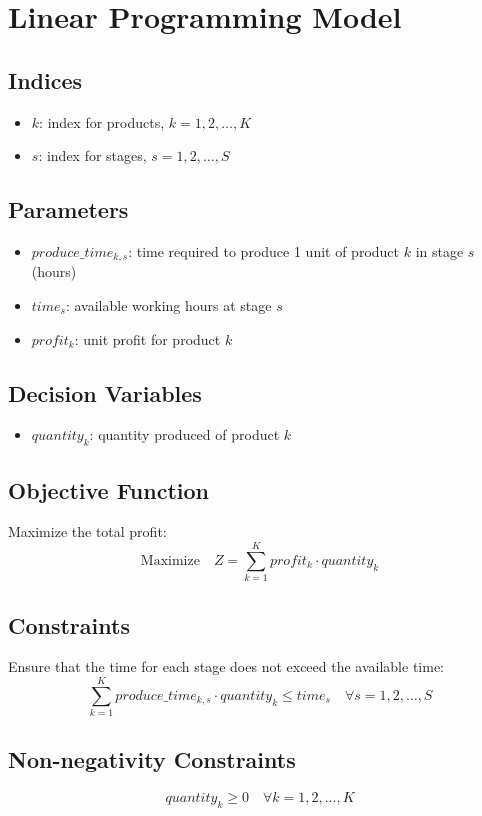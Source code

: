 \documentclass{article}
\begin{document}
\section*{Linear Programming Model}

\subsection*{Indices}
\begin{itemize}
    \item $k$: index for products, $k = 1, 2, \ldots, K$
    \item $s$: index for stages, $s = 1, 2, \ldots, S$
\end{itemize}

\subsection*{Parameters}
\begin{itemize}
    \item $produce\_time_{k, s}$: time required to produce 1 unit of product $k$ in stage $s$ (hours)
    \item $time_s$: available working hours at stage $s$
    \item $profit_k$: unit profit for product $k$
\end{itemize}

\subsection*{Decision Variables}
\begin{itemize}
    \item $quantity_k$: quantity produced of product $k$
\end{itemize}

\subsection*{Objective Function}
Maximize the total profit:
\[
\text{Maximize} \quad Z = \sum_{k=1}^{K} profit_k \cdot quantity_k
\]

\subsection*{Constraints}
Ensure that the time for each stage does not exceed the available time:
\[
\sum_{k=1}^{K} produce\_time_{k, s} \cdot quantity_k \leq time_s \quad \forall s = 1, 2, \ldots, S
\]

\subsection*{Non-negativity Constraints}
\[
quantity_k \geq 0 \quad \forall k = 1, 2, \ldots, K
\]
\end{document}
